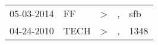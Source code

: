 \begin{tabular}{lllll}
\toprule
 05-03-2014 &    FF &  > &  , &   sfb \\
 04-24-2010 &  TECH &  > &  , &  1348 \\
\bottomrule
\end{tabular}
